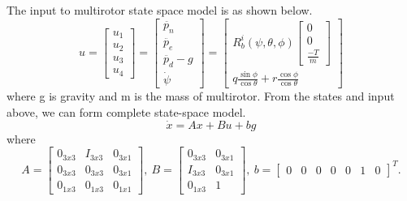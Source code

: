 \documentclass{article}
\begin{document}
The input to multirotor state space model is as shown below.
\[u=\begin{bmatrix}
u_1 \\ u_2 \\ u_3 \\ u_4
\end{bmatrix}=\begin{bmatrix}
\ddot{p_n} \\ \ddot{p_e} \\ \ddot{p_d}-g \\ \dot{\psi}
\end{bmatrix} =\begin{bmatrix}
R_b^i(\psi,\theta,\phi)\begin{bmatrix}
0\\ 0\\ \frac{-T}{m}
\end{bmatrix} \\
q\frac{\sin\phi}{\cos\theta}+r\frac{\cos\phi}{\cos\theta}
\end{bmatrix} \tag{2} \label{eq2}\]
where g is gravity and m is the mass of multirotor.
From the states and input above, we can form complete state-space model.
\[\dot{x}=Ax+Bu+bg\]
where \[A=\begin{bmatrix}
0_{3x3} & I_{3x3} & 0_{3x1}\\
0_{3x3} & 0_{3x3} & 0_{3x1}\\
0_{1x3} & 0_{1x3} & 0_{1x1}
\end{bmatrix}, \ B=\begin{bmatrix}
0_{3x3} & 0_{3x1}\\
I_{3x3} & 0_{3x1}\\
0_{1x3} & 1
\end{bmatrix}, \ b=\begin{bmatrix}
0 & 0 & 0 & 0 & 0 & 1 & 0
\end{bmatrix}^T. \]
\end{document}
